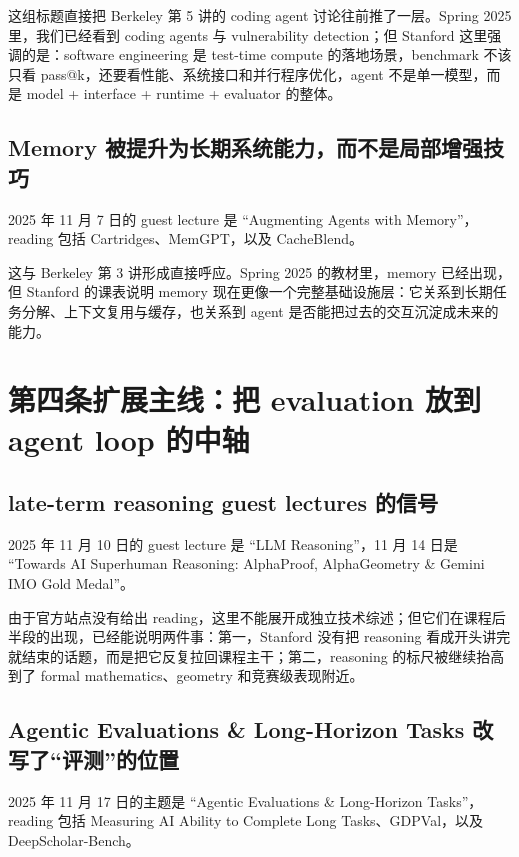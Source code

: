 \documentclass[UTF8]{ctexbook}
\begin{document}
这组标题直接把 Berkeley 第 5 讲的 coding agent 讨论往前推了一层。Spring 2025 里，我们已经看到 coding agents 与 vulnerability detection；但 Stanford 这里强调的是：software engineering 是 test-time compute 的落地场景，benchmark 不该只看 pass@k，还要看性能、系统接口和并行程序优化，agent 不是单一模型，而是 model + interface + runtime + evaluator 的整体。

\subsection{Memory 被提升为长期系统能力，而不是局部增强技巧}

2025 年 11 月 7 日的 guest lecture 是 ``Augmenting Agents with Memory''，reading 包括 Cartridges、MemGPT，以及 CacheBlend。

这与 Berkeley 第 3 讲形成直接呼应。Spring 2025 的教材里，memory 已经出现，但 Stanford 的课表说明 memory 现在更像一个完整基础设施层：它关系到长期任务分解、上下文复用与缓存，也关系到 agent 是否能把过去的交互沉淀成未来的能力。

\section{第四条扩展主线：把 evaluation 放到 agent loop 的中轴}

\subsection{late-term reasoning guest lectures 的信号}

2025 年 11 月 10 日的 guest lecture 是 ``LLM Reasoning''，11 月 14 日是 ``Towards AI Superhuman Reasoning: AlphaProof, AlphaGeometry \& Gemini IMO Gold Medal''。

由于官方站点没有给出 reading，这里不能展开成独立技术综述；但它们在课程后半段的出现，已经能说明两件事：第一，Stanford 没有把 reasoning 看成开头讲完就结束的话题，而是把它反复拉回课程主干；第二，reasoning 的标尺被继续抬高到了 formal mathematics、geometry 和竞赛级表现附近。

\subsection{Agentic Evaluations \& Long-Horizon Tasks 改写了“评测”的位置}

2025 年 11 月 17 日的主题是 ``Agentic Evaluations \& Long-Horizon Tasks''，reading 包括 Measuring AI Ability to Complete Long Tasks、GDPVal，以及 DeepScholar-Bench。
\end{document}
